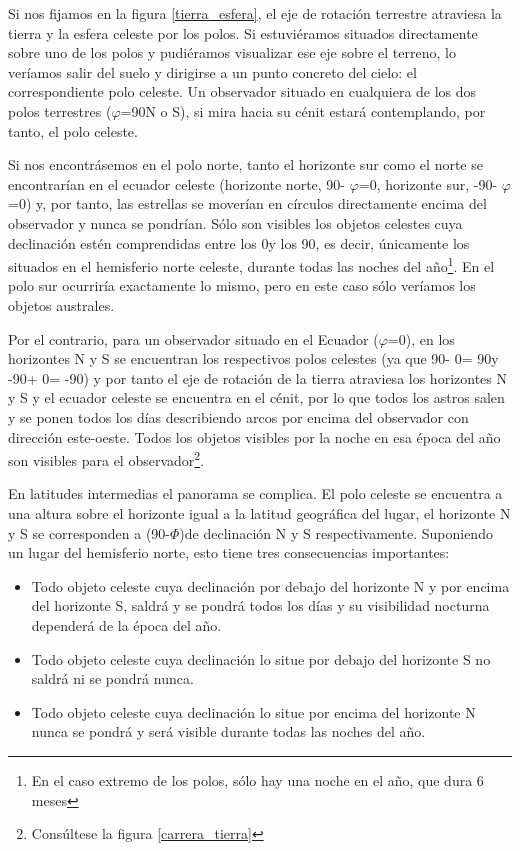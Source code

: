 \documentclass[10pt,a5paper,twoside]{amsbook}
\begin{document}
Si nos fijamos en la figura \ref{tierra_esfera}, el eje de rotación terrestre atraviesa la tierra y la esfera celeste por los polos. Si estuviéramos situados directamente sobre uno de los polos y pudiéramos visualizar ese eje sobre el terreno, lo veríamos salir del suelo y dirigirse a un punto concreto del cielo: el correspondiente polo celeste. Un observador situado en cualquiera de los dos polos terrestres ($\varphi$=90\textdegree  N o S), si mira hacia su cénit estará contemplando, por tanto, el polo celeste. 

Si nos encontrásemos en el polo norte, tanto el horizonte sur como el norte se encontrarían en el ecuador celeste (horizonte norte, 90\textdegree - $\varphi$=0\textdegree, horizonte sur, -90\textdegree - $\varphi$=0\textdegree) y, por tanto, las estrellas se moverían en círculos directamente encima del  observador y nunca se pondrían. Sólo son visibles los objetos celestes cuya declinación estén comprendidas entre los 0\textdegree y los 90\textdegree, es decir, únicamente los situados en el hemisferio norte celeste, durante todas las noches del año\footnote{En el caso extremo de los polos, sólo hay una noche en el año, que dura 6 meses}. En el polo sur ocurriría exactamente lo mismo, pero en este caso sólo veríamos los objetos australes.

Por el contrario, para un observador situado en el Ecuador ($\varphi$=0\textdegree), en los horizontes N y S se encuentran los respectivos polos celestes (ya que 90\textdegree - 0\textdegree = 90\textdegree y -90\textdegree + 0\textdegree = -90\textdegree) y por tanto el eje de rotación de la tierra atraviesa los horizontes N y S y el ecuador celeste se encuentra en el cénit, por lo que todos los astros salen y se ponen todos los días describiendo arcos por encima del observador con dirección este-oeste. Todos los objetos visibles por la noche en esa época del año son visibles para el observador\footnote{Consúltese la figura \ref{carrera_tierra}}.

En latitudes intermedias el panorama se complica. El polo celeste se encuentra a una altura sobre el horizonte igual a la latitud geográfica del lugar, el horizonte N y S se corresponden a (90-$\Phi$)\textdegree de declinación N y S respectivamente. Suponiendo un lugar del hemisferio norte, esto tiene tres consecuencias importantes:

\begin{itemize}
 \item Todo objeto celeste cuya declinación por debajo del horizonte N y por encima del horizonte S, saldrá y se pondrá todos los días y su visibilidad nocturna dependerá de la época del año.
 \item Todo objeto celeste cuya declinación lo situe por debajo del horizonte S no saldrá ni se pondrá nunca.
 \item Todo objeto celeste cuya declinación lo situe por encima del horizonte N nunca se pondrá y será visible durante todas las noches del año.
\end{itemize}
\end{document}
